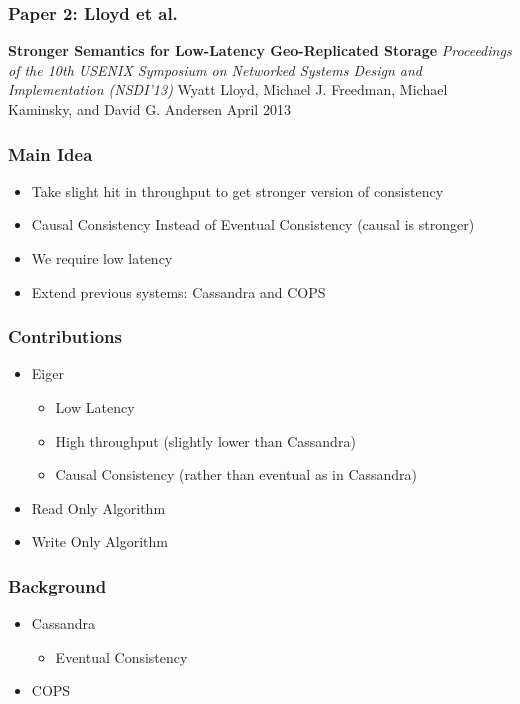 \documentclass{beamer}
\begin{document}
\begin{frame}
\frametitle{Paper 2: Lloyd et al.}

\textbf{Stronger Semantics for Low-Latency Geo-Replicated Storage} \newline
\textit{Proceedings of the 10th USENIX Symposium on Networked Systems Design and Implementation (NSDI’13)} \newline
Wyatt Lloyd, Michael J. Freedman, Michael Kaminsky, and David G. Andersen \newline
April 2013 \newline

\end{frame}

\begin{frame}
\frametitle{Main Idea}
\begin{itemize}

\pause \item Take slight hit in throughput to get stronger version of consistency
\pause \item Causal Consistency Instead of Eventual Consistency (causal is stronger)
\pause \item We require low latency
\pause \item Extend previous systems: Cassandra and COPS

\end{itemize}  
\end{frame}

\begin{frame}
\frametitle{Contributions}
\begin{itemize}
\pause \item Eiger
	\begin{itemize}
		\item Low Latency
		\item High throughput (slightly lower than Cassandra)
		\item Causal Consistency (rather than eventual as in Cassandra)
	\end{itemize}
\pause \item Read Only Algorithm
\pause \item Write Only Algorithm
\end{itemize}  
\end{frame}

\begin{frame}
\frametitle{Background}
\begin{itemize}
\pause \item Cassandra
	\begin{itemize}
		\item Eventual Consistency
	\end{itemize}
\pause \item COPS
\end{itemize}  
\end{frame}
\end{document}
